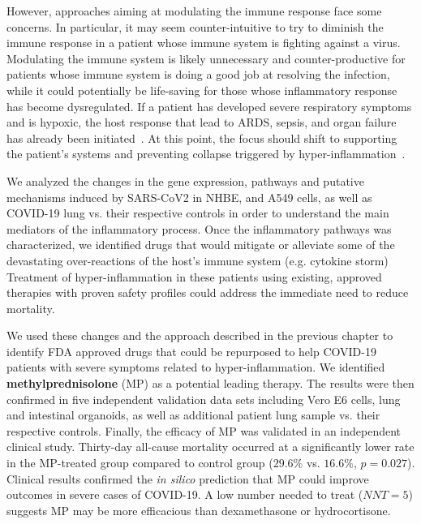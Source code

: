 \documentclass[Minh_PhD_thesis.tex]{subfiles}
\begin{document}
However, approaches aiming at modulating the immune response face some concerns. In particular, it may seem counter-intuitive to try to diminish the immune response in a patient whose immune system is fighting against a virus. Modulating the immune system is likely unnecessary and counter-productive for patients whose immune system is doing a good job at resolving the infection, while it could potentially be life-saving for those whose inflammatory response has become dysregulated. If a patient has developed severe respiratory symptoms and is hypoxic, the host response that lead to ARDS, sepsis, and organ failure has already been initiated~\cite{mehta2020covid}. At this point, the focus should shift to supporting the patient's systems and preventing collapse triggered by hyper-inflammation~\cite{Ayres2020:survivingCOVID19}. 

We analyzed the changes in the gene expression, pathways and putative mechanisms induced by SARS-CoV2 in NHBE, and A549 cells, as well as COVID-19 lung vs. their respective controls in order to understand the main mediators of the inflammatory process. Once the inflammatory pathways was characterized, we identified drugs that would mitigate or alleviate some of the devastating over-reactions of the host's immune system (e.g. cytokine storm)
Treatment of hyper-inflammation in these patients using existing, approved therapies with proven safety profiles could address the immediate need to reduce mortality. 


We used these changes and the approach described in the previous chapter to identify FDA approved drugs that could be repurposed to help COVID-19 patients with severe symptoms related to hyper-inflammation. We identified \textbf{methylprednisolone} (MP) as a potential leading therapy. 
The results were then confirmed in five independent validation data sets including Vero E6 cells, lung and intestinal organoids, as well as additional patient lung sample vs. their respective controls. Finally, the efficacy of MP was validated in an independent clinical study. 
Thirty-day all-cause mortality occurred at a significantly lower rate in the MP-treated group compared to control group ($29.6\%$ vs. $16.6\%$, $p=0.027$). Clinical results confirmed the \emph{in silico} prediction that MP could improve outcomes in severe cases of COVID-19.  A low number needed to treat ($NNT=5$) suggests MP may be more efficacious than dexamethasone or hydrocortisone. 
\end{document}
